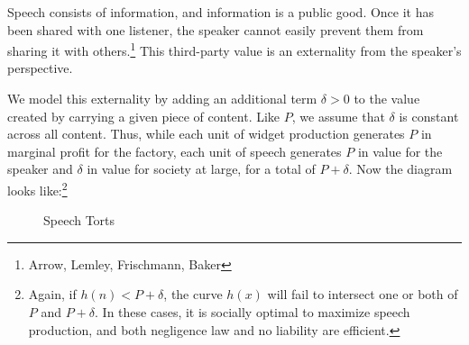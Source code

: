 Speech consists of information, and information is a public good. Once it has been shared with one listener, the speaker cannot easily prevent them from sharing it with others.\footnote{Arrow, Lemley, Frischmann, Baker} This third-party value is an externality from the speaker's perspective. 

We model this externality by adding an additional term $\delta > 0$ to the value created by carrying a given piece of content. Like $P$, we assume that $\delta$ is constant across all content. Thus, while each unit of widget production generates $P$ in marginal profit for the factory, each unit of speech generates $P$ in value for the speaker and $\delta$ in value for society at large, for a total of $P + \delta$. Now the diagram looks like:\footnote{Again, if $h(n) < P + \delta$, the curve $h(x)$ will fail to intersect one or both of $P$ and $P + \delta$. In these cases, it is socially optimal to maximize speech production, and both negligence law and no liability are efficient.}
\begin{figure}[h]
    \centering
{}
    \caption{Speech Torts}
    \label{fig:speech}
\end{figure}
